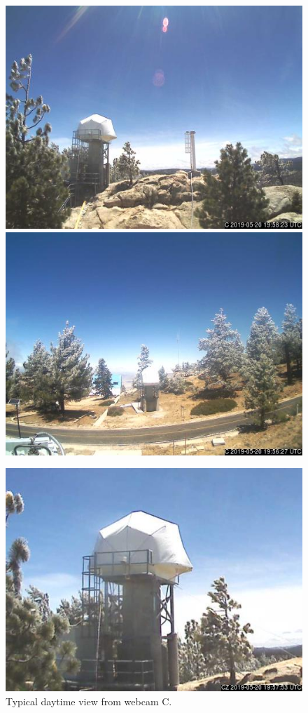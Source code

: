 \begin{figure}[t]
\begin{center}
\ifcoatli
\includegraphics[height=0.6\linewidth]{figures/coatli-webcam-c.jpg}
\fi
\ifddoti
\includegraphics[height=0.6\linewidth]{figures/ddoti-webcam-c.jpg}
\fi
\end{center}
\caption{Typical daytime view from {\projectname} webcam C.}
\label{figure:webcam-c-view}
\begin{center}
\ifcoatli
\includegraphics[height=0.6\linewidth]{figures/coatli-webcam-cz.jpg}

\end{center}
\end{figure}
